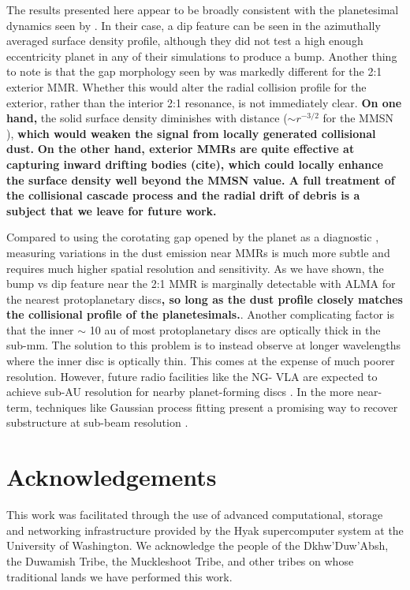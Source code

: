 \documentclass[fleqn,usenatbib]{mnras}
\begin{document}
The results presented here appear to be broadly consistent with the planetesimal dynamics seen by \citet{2016ApJ...818..159T}. In their case, a dip 
feature can be seen in the azimuthally averaged surface density profile, although they did not test a high enough eccentricity planet in any of their 
simulations to produce a bump. Another thing to note is that the gap morphology seen by \citet{2016ApJ...818..159T} was markedly different for the 
2:1 exterior MMR. Whether this would alter the radial collision profile for the exterior, rather than the interior 2:1 resonance, is not immediately clear.  
\textbf{On one hand,} the solid surface density diminishes with distance ($\sim r^{-3/2}$ for the MMSN \citep{1981PThPS..70...35H}), \textbf{which would weaken the signal from locally generated collisional dust.} \textbf{On the other hand, exterior MMRs are quite effective at capturing inward drifting bodies (cite), which could locally enhance the surface density well beyond the MMSN value. A full treatment of the collisional cascade process and the radial drift of debris is a subject that we leave for future work.}

Compared to using the corotating gap opened by the planet as a diagnostic \citep{2013ApJ...777L..31D, 2016ApJ...820...29D}, measuring 
variations in the dust emission near MMRs is much more subtle and requires much higher spatial resolution and sensitivity. As we have shown, the 
bump vs dip feature near the 2:1 MMR is marginally detectable with ALMA for the nearest protoplanetary discs\textbf{, so long as the dust profile closely matches the collisional profile of the planetesimals.}. Another complicating factor is that 
the inner $\sim$ 10 au of most protoplanetary discs are optically thick in the sub-mm. The solution to this problem is to instead observe at longer 
wavelengths where the inner disc is optically thin. This comes at the expense of much poorer resolution. However, future radio facilities like the NG-
VLA are expected to achieve sub-AU resolution for nearby planet-forming discs \citep{2018ASPC..517..147R}. In the more near-term, techniques 
like Gaussian process fitting present a promising way to recover substructure at sub-beam resolution \citep{2020arXiv200507709J}.

\section*{Acknowledgements}
This work was facilitated through the use of advanced computational, storage and networking infrastructure provided by the Hyak supercomputer system at the 
University of Washington. We acknowledge the people of the Dkhw’Duw’Absh, the Duwamish Tribe, the Muckleshoot Tribe, and other tribes on whose traditional 
lands we have performed this work.
\end{document}
